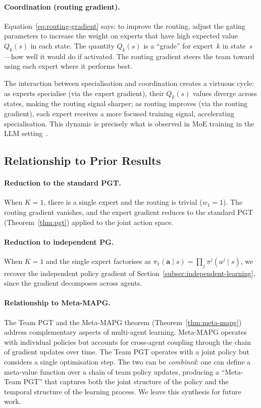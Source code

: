 \paragraph{Coordination (routing gradient).} Equation~\eqref{eq:routing-gradient} says: to improve the routing, adjust the gating parameters to increase the weight on experts that have high expected value $Q_k(s)$ in each state. The quantity $Q_k(s)$ is a ``grade'' for expert~$k$ in state~$s$---how well it would do if activated. The routing gradient steers the team toward using each expert where it performs best.

The interaction between specialisation and coordination creates a virtuous cycle: as experts specialise (via the expert gradient), their $Q_k(s)$ values diverge across states, making the routing signal sharper; as routing improves (via the routing gradient), each expert receives a more focused training signal, accelerating specialisation. This dynamic is precisely what is observed in MoE training in the LLM setting~\cite{deepseekv3}.

\subsection{Relationship to Prior Results}
\label{subsec:team-relations}

\paragraph{Reduction to the standard PGT.} When $K=1$, there is a single expert and the routing is trivial ($w_1=1$). The routing gradient vanishes, and the expert gradient reduces to the standard PGT (Theorem~\ref{thm:pgt}) applied to the joint action space.

\paragraph{Reduction to independent PG.} When $K=1$ and the single expert factorises as $\pi_1(\bm{a}\mid s)=\prod_j\pi^j(a^j\mid s)$, we recover the independent policy gradient of Section~\ref{subsec:independent-learning}, since the gradient decomposes across agents.

\paragraph{Relationship to Meta-MAPG.} The Team PGT and the Meta-MAPG theorem (Theorem~\ref{thm:meta-mapg}) address complementary aspects of multi-agent learning. Meta-MAPG operates with individual policies but accounts for cross-agent coupling through the chain of gradient updates over time. The Team PGT operates with a joint policy but considers a single optimisation step. The two can be \emph{combined}: one can define a meta-value function over a chain of team policy updates, producing a ``Meta-Team PGT'' that captures both the joint structure of the policy and the temporal structure of the learning process. We leave this synthesis for future work.

